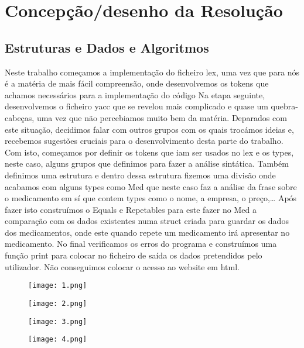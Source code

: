 \documentclass{report}
\begin{document}
\chapter{Concepção/desenho da Resolução}
\section{Estruturas e Dados e Algoritmos}

Neste trabalho começamos a implementação do ficheiro lex, uma vez que para nós é a
matéria de mais fácil compreensão, onde desenvolvemos os tokens que achamos necessários
para a implementação do código  
Na etapa seguinte, desenvolvemos o ficheiro yacc que se revelou mais complicado
e quase um quebra-cabeças, uma vez que não percebiamos muito bem da matéria.
Deparados com este situação, decidimos falar com outros grupos com os quais trocámos ideias e, 
recebemos sugestões cruciais para o desenvolvimento desta parte do trabalho. Com isto, começamos por definir os tokens que iam ser usados no lex e os types, 
neste caso, alguns grupos que definimos para fazer a análise sintática.
Também definimos uma estrutura e dentro dessa estrutura fizemos uma divisão onde 
acabamos com alguns types como Med que neste caso faz a análise da frase sobre o 
medicamento em sí que contem types como o nome, a empresa, o preço,… Após fazer isto construímos o Equals e Repetables para este fazer no Med
a comparação com os dados existentes numa struct criada para guardar os 
dados dos medicamentos, onde este quando repete um medicamento irá apresentar no medicamento.
No final verificamos os erros do programa e construímos uma função print
para colocar no ficheiro de saída os dados pretendidos pelo utilizador. 
Não conseguimos colocar o acesso ao website em html.



\begin{figure}
    \centering
    \texttt{[image: 1.png]}
\end{figure}


\begin{figure}
    \centering
    \texttt{[image: 2.png]}
\end{figure}


\begin{figure}
    \centering
    \texttt{[image: 3.png]}
\end{figure}


\begin{figure}
    \centering
    \texttt{[image: 4.png]}
\end{figure}
\end{document}
